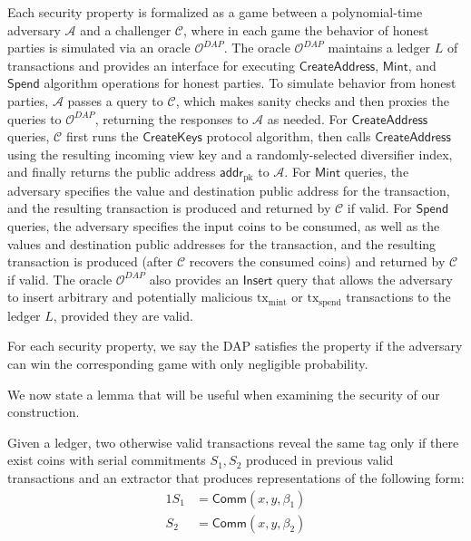 \documentclass{llncs}
\newcommand{\func}[1]{\mathsf{#1}}
\newcommand{\addr}{\func{addr}}
\newcommand{\comm}{\func{Comm}}
\begin{document}
Each security property is formalized as a game between a polynomial-time adversary $\mathcal{A}$ and a challenger $\mathcal{C}$, where in each game the behavior of honest parties is simulated via an oracle $\mathcal{O}^{DAP}$.
The oracle $\mathcal{O}^{DAP}$ maintains a ledger $L$ of transactions and provides an interface for executing $\func{CreateAddress}$, $\func{Mint}$, and $\func{Spend}$ algorithm operations for honest parties.
To simulate behavior from honest parties, $\mathcal{A}$ passes a query to $\mathcal{C}$, which makes sanity checks and then proxies the queries to $\mathcal{O}^{DAP}$, returning the responses to $\mathcal{A}$ as needed.
For $\func{CreateAddress}$ queries, $\mathcal{C}$ first runs the $\func{CreateKeys}$ protocol algorithm, then calls $\func{CreateAddress}$ using the resulting incoming view key and a randomly-selected diversifier index, and finally returns the public address $\addr_{\text{pk}}$ to $\mathcal{A}$.
For $\func{Mint}$ queries, the adversary specifies the value and destination public address for the transaction, and the resulting transaction is produced and returned by $\mathcal{C}$ if valid.
For $\func{Spend}$ queries, the adversary specifies the input coins to be consumed, as well as the values and destination public addresses for the transaction, and the resulting transaction is produced (after $\mathcal{C}$ recovers the consumed coins) and returned by $\mathcal{C}$ if valid.
The oracle $\mathcal{O}^{DAP}$ also provides an $\func{Insert}$ query that allows the adversary to insert arbitrary and potentially malicious $\text{tx}_{\text{mint}}$ or $\text{tx}_{\text{spend}}$ transactions to the ledger $L$, provided they are valid.

For each security property, we say the DAP satisfies the property if the adversary can win the corresponding game with only negligible probability.

We now state a lemma that will be useful when examining the security of our construction.

\begin{lemma}\label{lem:extract}
    Given a ledger, two otherwise valid transactions reveal the same tag only if there exist coins with serial commitments $S_1,S_2$ produced in previous valid transactions and an extractor that produces representations of the following form:
    \begin{alignat*}{1}
        S_1 &= \comm(x,y,\beta_1) \\
        S_2 &= \comm(x,y,\beta_2)
    \end{alignat*}
\end{lemma}
\end{document}
